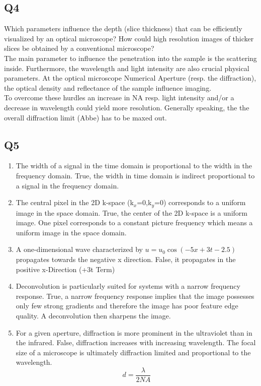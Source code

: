 \subsection*{Q4}
Which parameters influence the depth (slice thickness) that can be efficiently visualized by an optical microscope? How could high resolution images of thicker slices be obtained by a conventional microscope?
\\[2\baselineskip]
The main parameter to influence the penetration into the sample is the scattering inside. Furthermore, the wavelength and light intensity are also crucial physical parameters. At the optical microscope Numerical Aperture (resp. the diffraction), the optical density and reflectance of the sample influence imaging.\\
To overcome these hurdles an increase in NA resp. light intensity and/or a decrease in wavelength could yield more resolution. Generally speaking, the the overall diffraction limit (Abbe) has to be maxed out.


\subsection*{Q5}
\begin{enumerate}[label=\alph*]
    \item The width of a signal in the time domain is proportional to the width in the frequency domain.
    \subitem True, the width in time domain is indirect proportional to a signal in the frequency domain. 
    \item The central pixel in the 2D k-space (k$_x$=0,k$_y$=0) corresponds to a uniform image in the space domain.
    \subitem True, the center of  the 2D k-space is a uniform image. One pixel corresponds to a constant picture frequency which means a uniform image in the space domain.
    \item A one-dimensional wave characterized by $u = u_0 \cos(−5x+3t−2.5)$ propagates towards the negative x direction.
    \subitem False, it propagates in the positive x-Direction (+3t Term)
    \item Deconvolution is particularly suited for systems with a narrow frequency response.
    \subitem True, a narrow frequency response implies that the image possesses only few strong gradients and therefore the image has poor feature edge quality. A deconvolution then sharpens the image.
    \item For a given aperture, diffraction is more prominent in the ultraviolet than in the infrared. 
    \subitem False, diffraction increases with increasing wavelength. The focal size of a microscope is ultimately diffraction limited and proportional to the wavelength.
    \begin{equation}
        d =\frac{\lambda}{2NA}
    \end{equation}
\end{enumerate}


